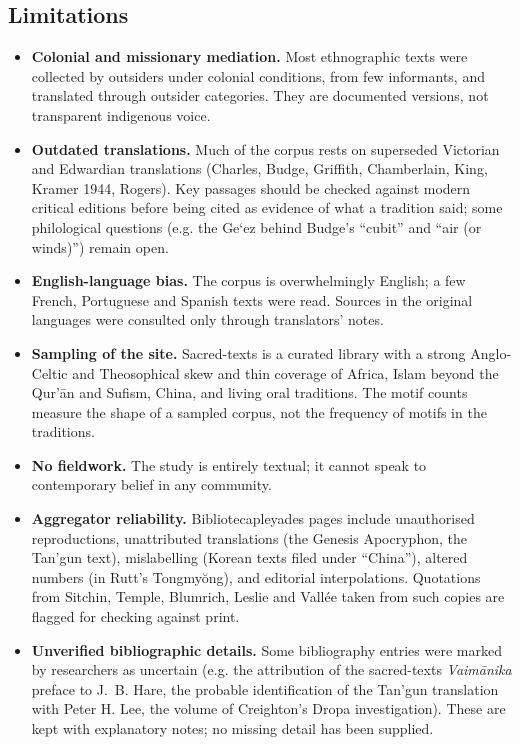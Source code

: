 \documentclass[11pt,a4paper]{article}
\begin{document}
\subsection{Limitations}

\begin{itemize}
\item \textbf{Colonial and missionary mediation.} Most ethnographic texts were collected by outsiders under colonial conditions, from few informants, and translated through outsider categories. They are documented versions, not transparent indigenous voice.
\item \textbf{Outdated translations.} Much of the corpus rests on superseded Victorian and Edwardian translations (Charles, Budge, Griffith, Chamberlain, King, Kramer 1944, Rogers). Key passages should be checked against modern critical editions before being cited as evidence of what a tradition said; some philological questions (e.g. the Ge`ez behind Budge's ``cubit'' and ``air (or winds)'') remain open.
\item \textbf{English-language bias.} The corpus is overwhelmingly English; a few French, Portuguese and Spanish texts were read. Sources in the original languages were consulted only through translators' notes.
\item \textbf{Sampling of the site.} Sacred-texts is a curated library with a strong Anglo-Celtic and Theosophical skew and thin coverage of Africa, Islam beyond the Qur'ān and Sufism, China, and living oral traditions. The motif counts measure the shape of a sampled corpus, not the frequency of motifs in the traditions.
\item \textbf{No fieldwork.} The study is entirely textual; it cannot speak to contemporary belief in any community.
\item \textbf{Aggregator reliability.} Bibliotecapleyades pages include unauthorised reproductions, unattributed translations (the Genesis Apocryphon, the Tan'gun text), mislabelling (Korean texts filed under ``China''), altered numbers (in Rutt's Tongmyŏng), and editorial interpolations. Quotations from Sitchin, Temple, Blumrich, Leslie and Vallée taken from such copies are flagged for checking against print.
\item \textbf{Unverified bibliographic details.} Some bibliography entries were marked by researchers as uncertain (e.g. the attribution of the sacred-texts \emph{Vaimānika} preface to J.~B. Hare, the probable identification of the Tan'gun translation with Peter H. Lee, the volume of Creighton's Dropa investigation). These are kept with explanatory notes; no missing detail has been supplied.
\end{itemize}
\end{document}
